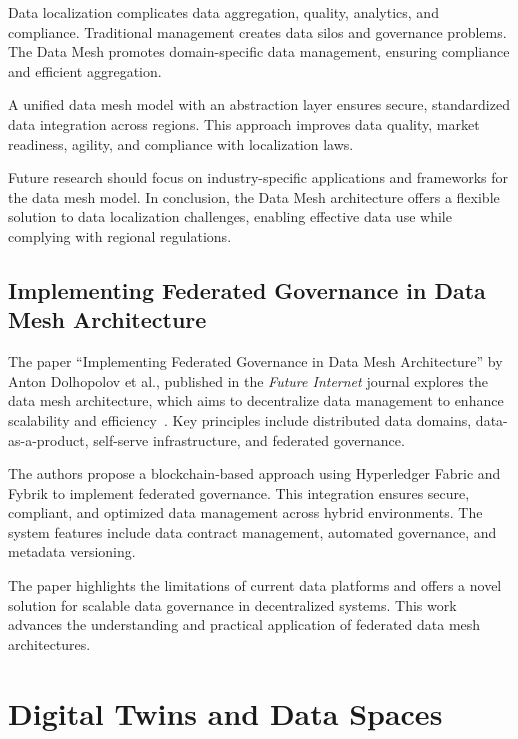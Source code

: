 Data localization complicates data aggregation, quality, analytics, and compliance.
Traditional management creates data silos and governance problems.
The Data Mesh promotes domain-specific data management, ensuring compliance and efficient aggregation.

A unified data mesh model with an abstraction layer ensures secure, standardized data integration across regions.
This approach improves data quality, market readiness, agility, and compliance with localization laws.

Future research should focus on industry-specific applications and frameworks for the data mesh model.
In conclusion, the Data Mesh architecture offers a flexible solution to data localization challenges, enabling effective data use while complying with regional regulations.

\subsection{Implementing Federated Governance in Data Mesh Architecture}\label{subsec:implementing-federated-governance-in-data-mesh-architecture}

The paper ``Implementing Federated Governance in Data Mesh Architecture'' by Anton Dolhopolov et al., published in the \textit{Future Internet} journal explores the data mesh architecture, which aims to decentralize data management to enhance scalability and efficiency~\cite{implementing_federated_governance}.
Key principles include distributed data domains, data-as-a-product, self-serve infrastructure, and federated governance.

The authors propose a blockchain-based approach using Hyperledger Fabric and Fybrik to implement federated governance. %
This integration ensures secure, compliant, and optimized data management across hybrid environments.
The system features include data contract management, automated governance, and metadata versioning.

The paper highlights the limitations of current data platforms and offers a novel solution for scalable data governance in decentralized systems.
This work advances the understanding and practical application of federated data mesh architectures.

\section{Digital Twins and Data Spaces}\label{sec:digital-twins-and-data-spaces}

